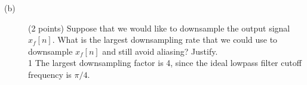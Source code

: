 \documentclass[10pt]{article}
\def\SOLUTIONS{0} %
\def\SolutionsColor{red2}
\begin{document}
\begin{description}
\item[(b)]  (2 points) Suppose that we would like to downsample the output signal $x_f[n]$. What is the largest downsampling rate that we could use to downsample $x_f[n]$ and still avoid aliasing? Justify. \\
\if\SOLUTIONS1
{\color{\SolutionsColor}
The largest downsampling factor is 4, since the ideal lowpass filter cutoff frequency is $\pi/4$.
}
\else\vspace{1cm}
\fi

\end{description}
\newpage
%
%
%
%
%
%
\end{document}
